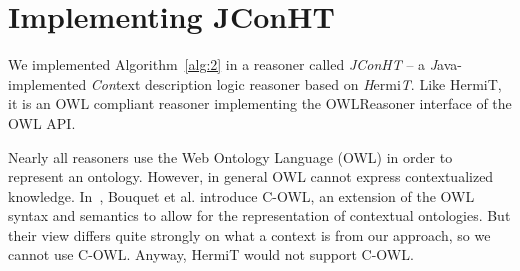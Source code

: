 





  







\section{Implementing JConHT}
\label{sec:implementing-jconht}

We implemented Algorithm~\ref{alg:2} in a reasoner called \emph{JConHT} -- a \emph{J}ava-implemented
\emph{Con}text description logic reasoner based on \emph{H}ermi\emph{T}. Like HermiT, it is an OWL
compliant reasoner implementing the \textsf{OWLReasoner} interface of the OWL API.

Nearly all reasoners use the Web Ontology Language (OWL) in order to represent an ontology.
However, in general OWL cannot express contextualized knowledge. In~\cite{BoGH-ISWC03}, Bouquet et
al. introduce C-OWL, an extension of the OWL syntax and semantics to allow for the representation of
contextual ontologies. But their view differs quite strongly on what a context is from our approach,
so we cannot use C-OWL. Anyway, HermiT would not support C-OWL.

